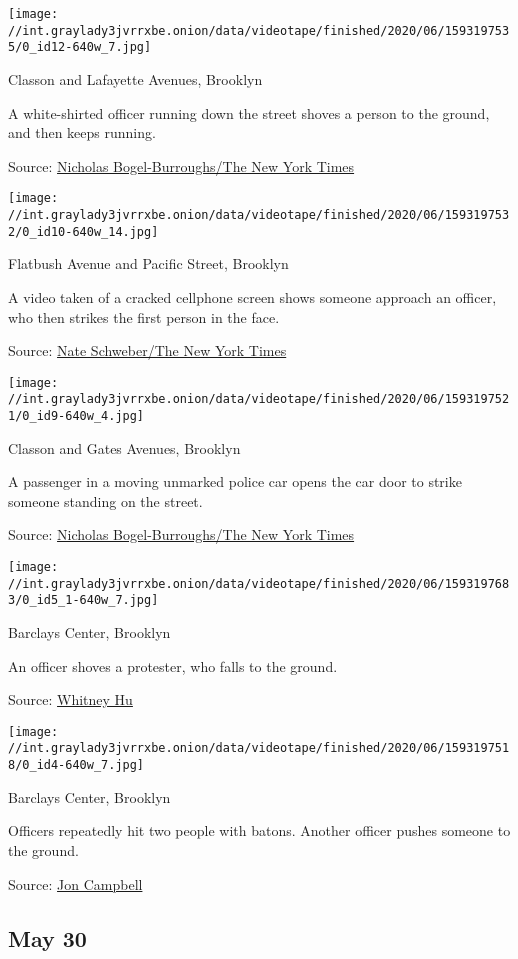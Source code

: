 \texttt{[image: //int.graylady3jvrrxbe.onion/data/videotape/finished/2020/06/1593197535/0\_id12-640w\_7.jpg]}

 Classon and Lafayette Avenues, Brooklyn

 A white-shirted officer running down the street shoves a person to the
ground, and then keeps running.

Source:
\href{https://twitter.com/NickAtNews/status/1266567790095486976}{Nicholas
Bogel-Burroughs/The New York Times}

\texttt{[image: //int.graylady3jvrrxbe.onion/data/videotape/finished/2020/06/1593197532/0\_id10-640w\_14.jpg]}

 Flatbush Avenue and Pacific Street, Brooklyn

 A video taken of a cracked cellphone screen shows someone approach an
officer, who then strikes the first person in the face.

Source:
\href{https://twitter.com/nateschweber/status/1266539107632758784}{Nate
Schweber/The New York Times}

\texttt{[image: //int.graylady3jvrrxbe.onion/data/videotape/finished/2020/06/1593197521/0\_id9-640w\_4.jpg]}

 Classon and Gates Avenues, Brooklyn

 A passenger in a moving unmarked police car opens the car door to
strike someone standing on the street.

Source:
\href{https://twitter.com/NickAtNews/status/1266537738364477446}{Nicholas
Bogel-Burroughs/The New York Times}

\texttt{[image: //int.graylady3jvrrxbe.onion/data/videotape/finished/2020/06/1593197683/0\_id5\_1-640w\_7.jpg]}

 Barclays Center, Brooklyn

 An officer shoves a protester, who falls to the ground.

Source:
\href{https://twitter.com/whitney_hu/status/1266540710188195843}{Whitney
Hu}

\texttt{[image: //int.graylady3jvrrxbe.onion/data/videotape/finished/2020/06/1593197518/0\_id4-640w\_7.jpg]}

 Barclays Center, Brooklyn

 Officers repeatedly hit two people with batons. Another officer pushes
someone to the ground.

Source:
\href{https://twitter.com/j0ncampbell/status/1266514356071735296}{Jon
Campbell}

\hypertarget{may-30}{%
\subsection{May 30}\label{may-30}}


